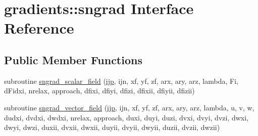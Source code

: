 \hypertarget{interfacegradients_1_1sngrad}{\section{gradients\-:\-:sngrad Interface Reference}
\label{interfacegradients_1_1sngrad}
}
\subsection*{Public Member Functions}
\begin{DoxyCompactItemize}
\item 
subroutine \hyperlink{interfacegradients_1_1sngrad_affa8140fcac9e45801f4294358d95ec5}{sngrad\-\_\-scalar\-\_\-field} (\hyperlink{CourantNo_8h_accea320a458bb8759c7ece360e05ddf4}{ijp}, ijn, xf, yf, zf, arx, ary, arz, lambda, Fi, d\-Fidxi, nrelax, approach, dfixi, dfiyi, dfizi, dfixii, dfiyii, dfizii)
\item 
subroutine \hyperlink{interfacegradients_1_1sngrad_a0785287d1c2730d2f46ee22873cac7e0}{sngrad\-\_\-vector\-\_\-field} (\hyperlink{CourantNo_8h_accea320a458bb8759c7ece360e05ddf4}{ijp}, ijn, xf, yf, zf, arx, ary, arz, lambda, u, v, w, dudxi, dvdxi, dwdxi, nrelax, approach, duxi, duyi, duzi, dvxi, dvyi, dvzi, dwxi, dwyi, dwzi, duxii, dvxii, dwxii, duyii, dvyii, dwyii, duzii, dvzii, dwzii)
\end{DoxyCompactItemize}


